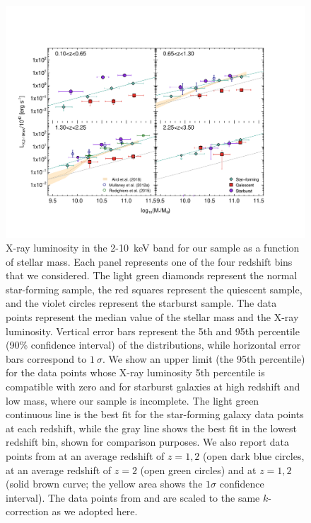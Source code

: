    \begin{figure}
   \centering
   \includegraphics[trim={1cm 2cm 2.5cm 3cm}, clip,width=\textwidth]{Figs/Chapter2/L_X.pdf}
      \caption{X-ray luminosity in the 2-10~keV band for our sample as a function of stellar mass. Each panel represents one of the four redshift bins that we considered. The light green diamonds represent the normal star-forming sample, the red squares represent the quiescent sample, and the violet circles represent the starburst sample. The data points represent the median value of the stellar mass and the X-ray luminosity. Vertical error bars represent the 5th and 95th percentile (90\% confidence interval) of the distributions, while horizontal error bars correspond to $1~\sigma$. We show an upper limit (the 95th percentile) for the data points whose X-ray luminosity 5th percentile is compatible with zero and for starburst galaxies at high redshift and low mass, where our sample is incomplete.
      The light green continuous line is the best fit for the star-forming galaxy data points at each redshift, while the gray line shows the best fit in the lowest redshift bin, shown for comparison purposes.  
      We also report data points from \citet{2012ApJ...753L..30M} at an average redshift of $z=1,2$ (open dark blue circles, \citet{2015ApJ...800L..10R} at an average redshift of $z=2$ (open green circles) and \citet{2018MNRAS.474.1225A} at $z=1,2$ (solid brown curve; the yellow area shows the $1\sigma$ confidence interval). The data points from \citet{2015ApJ...800L..10R} and \citet{2018MNRAS.474.1225A} are scaled to the same $k$-correction as we adopted here.
              }
         \label{fig:L_X}
   \end{figure}
